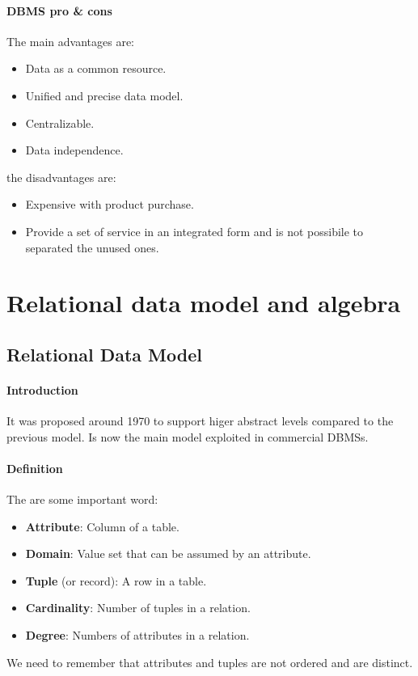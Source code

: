 \documentclass[12pt]{article}
\begin{document}
\paragraph{DBMS pro \& cons}
The main advantages are:
\begin{itemize}
  \item Data as a common resource.
  \item Unified and precise data model.
  \item Centralizable.
  \item Data independence.
\end{itemize}
the disadvantages are:
\begin{itemize}
  \item Expensive with product purchase.
  \item Provide a set of service in an integrated form and is not possibile to separated the unused ones.
\end{itemize}

\section{Relational data model and algebra}
\subsection{Relational Data Model}
\paragraph{Introduction}
It was proposed around 1970 to support higer abstract levels compared to the previous model. Is now the main model exploited in commercial DBMSs.
\paragraph{Definition}
The are some important word:
\begin{itemize}
  \item \textbf{Attribute}: Column of a table.
  \item \textbf{Domain}: Value set that can be assumed by an attribute.
  \item \textbf{Tuple} (or record): A row in a table.
  \item \textbf{Cardinality}: Number of tuples in a relation.
  \item \textbf{Degree}: Numbers of attributes in a relation.
\end{itemize}
We need to remember that attributes and tuples are not ordered and are distinct.
\end{document}
